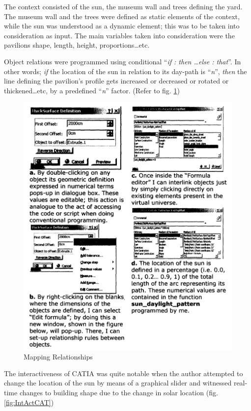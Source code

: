 The context consisted of the sun, the museum wall and trees defining the yard. The museum wall and the trees were defined as static elements of the context, while the sun was understood as a dynamic element; this was to be taken into consideration as input. The main variables taken into consideration were the pavilions shape, length, height, proportions\ldots etc. 

Object relations were programmed using conditional ``\emph{if : then \dots else : that}''. In other words; \emph{if} the location of the sun in relation to its day-path is ``\emph{n}'', \emph{then} the line defining the pavilion's profile gets increased or decreased or rotated or thickened\ldots etc, by a predefined ``\emph{n}'' factor. (Refer to fig. \ref{fig:MpRlt})

\begin{figure}[htbp]
\centering
\includegraphics[width=\textwidth]{./Images/5-MappingRelations}
\caption[Mapping Design Relations]{Mapping Relationships \cite{zulas04}}
\label{fig:MpRlt}
\end{figure}

The interactiveness of CATIA was quite notable when the author attempted to change the location of the sun by means of a graphical slider and witnessed real-time changes to building shape due to the change in solar location (fig. \ref{fig:IntActCAT})

